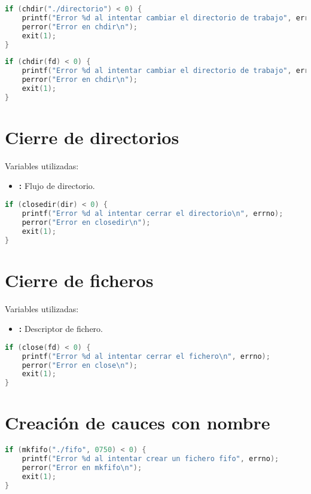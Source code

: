 \begin{lstlisting}[language=C]
if (chdir("./directorio") < 0) {
	printf("Error %d al intentar cambiar el directorio de trabajo", errno);
	perror("Error en chdir\n");
	exit(1);
}

\end{lstlisting}
\begin{lstlisting}[language=C]
if (chdir(fd) < 0) {
	printf("Error %d al intentar cambiar el directorio de trabajo", errno);
	perror("Error en chdir\n");
	exit(1);
}
\end{lstlisting}

\pagebreak

\section{Cierre de directorios}

Variables utilizadas:

\begin{itemize}
	\item{}\textbf{:} Flujo de directorio.
\end{itemize}

\begin{lstlisting}[language=C]
if (closedir(dir) < 0) {
	printf("Error %d al intentar cerrar el directorio\n", errno);
	perror("Error en closedir\n");
	exit(1);
}
\end{lstlisting}

\section{Cierre de ficheros}

Variables utilizadas:

\begin{itemize}
	\item{}\textbf{:} Descriptor de fichero.
\end{itemize}

\begin{lstlisting}[language=C]
if (close(fd) < 0) {
	printf("Error %d al intentar cerrar el fichero\n", errno);
	perror("Error en close\n");
	exit(1);
}
\end{lstlisting}

\section{Creación de cauces con nombre}

\begin{lstlisting}[language=C]
if (mkfifo("./fifo", 0750) < 0) {
	printf("Error %d al intentar crear un fichero fifo", errno);
	perror("Error en mkfifo\n");
	exit(1);
}
\end{lstlisting}

